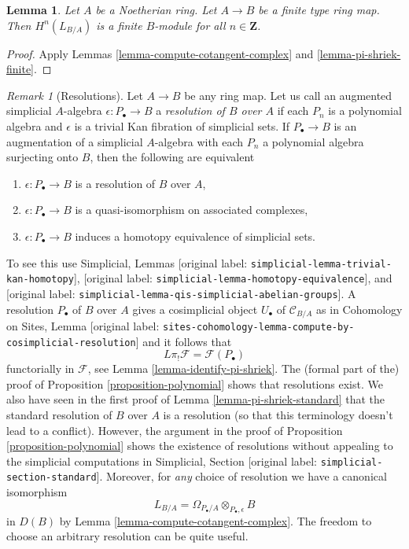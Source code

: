 \documentclass[10pt,a4paper]{article}
\theoremstyle{plain}
\newtheorem{lemma}[subsection]{Lemma}
\theoremstyle{definition}
\theoremstyle{remark}
\newtheorem{remark}[subsection]{Remark}
\numberwithin{equation}{subsection}
\begin{document}
\begin{lemma}
\label{lemma-cotangent-finite}
Let $A$ be a Noetherian ring. Let $A \to B$ be a finite type ring map.
Then $H^n(L_{B/A})$ is a finite $B$-module for all $n \in \mathbf{Z}$.
\end{lemma}

\begin{proof}
Apply Lemmas \ref{lemma-compute-cotangent-complex} and
\ref{lemma-pi-shriek-finite}.
\end{proof}

\begin{remark}[Resolutions]
\label{remark-resolution}
Let $A \to B$ be any ring map. Let us call an augmented simplicial $A$-algebra
$\epsilon : P_\bullet \to B$ a {\it resolution of $B$ over $A$} if
each $P_n$ is a polynomial algebra and $\epsilon$ is a trivial Kan fibration
of simplicial sets. If $P_\bullet \to B$ is an augmentation of a simplicial
$A$-algebra with each $P_n$ a polynomial algebra surjecting onto $B$, then
the following are equivalent
\begin{enumerate}
\item $\epsilon : P_\bullet \to B$ is a resolution of $B$ over $A$,
\item $\epsilon : P_\bullet \to B$ is a quasi-isomorphism on
associated complexes,
\item $\epsilon : P_\bullet \to B$ induces a homotopy equivalence
of simplicial sets.
\end{enumerate}
To see this use Simplicial, Lemmas
\textnormal{[original label: \nolinkurl{simplicial-lemma-trivial-kan-homotopy}]},
\textnormal{[original label: \nolinkurl{simplicial-lemma-homotopy-equivalence}]}, and
\textnormal{[original label: \nolinkurl{simplicial-lemma-qis-simplicial-abelian-groups}]}.
A resolution $P_\bullet$ of $B$ over $A$ gives a cosimplicial object
$U_\bullet$ of $\mathcal{C}_{B/A}$ as in Cohomology on Sites, Lemma
\textnormal{[original label: \nolinkurl{sites-cohomology-lemma-compute-by-cosimplicial-resolution}]}
and it follows that
$$
L\pi_!\mathcal{F} = \mathcal{F}(P_\bullet)
$$
functorially in $\mathcal{F}$, see Lemma \ref{lemma-identify-pi-shriek}.
The (formal part of the) proof of Proposition \ref{proposition-polynomial}
shows that resolutions exist. We also have seen in the first proof of
Lemma \ref{lemma-pi-shriek-standard} that the standard resolution of $B$
over $A$ is a resolution (so that this terminology doesn't lead to a conflict).
However, the argument in the proof of Proposition \ref{proposition-polynomial}
shows the existence of resolutions without appealing to the simplicial
computations in Simplicial, Section \textnormal{[original label: \nolinkurl{simplicial-section-standard}]}.
Moreover, for {\it any} choice of resolution we have a canonical isomorphism
$$
L_{B/A} = \Omega_{P_\bullet/A} \otimes_{P_\bullet, \epsilon} B
$$
in $D(B)$ by Lemma \ref{lemma-compute-cotangent-complex}. The freedom to
choose an arbitrary resolution can be quite useful.
\end{remark}
\end{document}
